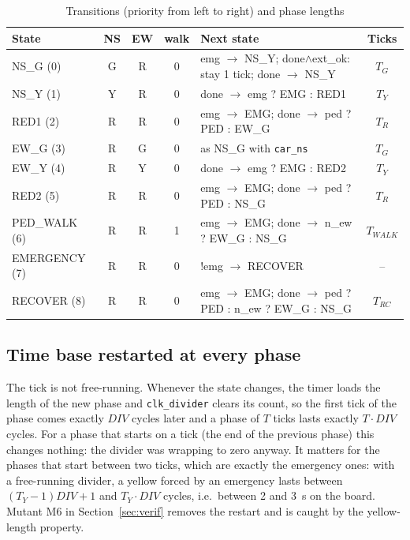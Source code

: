 \documentclass[conference]{IEEEtran}
\newcommand{\code}[1]{\texttt{\upshape #1}}
\newcommand{\st}[1]{\textsf{#1}}         %
\begin{document}
\begin{table}[t]
\centering
\caption{Transitions (priority from left to right) and phase lengths}
\label{tab:fsm}
\scriptsize
\setlength{\tabcolsep}{3pt}
\begin{tabular}{@{}l c c c l c@{}}
\toprule
State & NS & EW & walk & Next state & Ticks \\
\midrule
\st{NS\_G} (0) & G & R & 0 & emg $\to$ \st{NS\_Y}; done$\wedge$ext\_ok: stay 1 tick; done $\to$ \st{NS\_Y} & $T_G$ \\
\st{NS\_Y} (1) & Y & R & 0 & done $\to$ emg ? \st{EMG} : \st{RED1} & $T_Y$ \\
\st{RED1} (2) & R & R & 0 & emg $\to$ \st{EMG}; done $\to$ ped ? \st{PED} : \st{EW\_G} & $T_R$ \\
\st{EW\_G} (3) & R & G & 0 & as \st{NS\_G} with \code{car\_ns} & $T_G$ \\
\st{EW\_Y} (4) & R & Y & 0 & done $\to$ emg ? \st{EMG} : \st{RED2} & $T_Y$ \\
\st{RED2} (5) & R & R & 0 & emg $\to$ \st{EMG}; done $\to$ ped ? \st{PED} : \st{NS\_G} & $T_R$ \\
\st{PED\_WALK} (6) & R & R & 1 & emg $\to$ \st{EMG}; done $\to$ n\_ew ? \st{EW\_G} : \st{NS\_G} & $T_{WALK}$ \\
\st{EMERGENCY} (7) & R & R & 0 & !emg $\to$ \st{RECOVER} & -- \\
\st{RECOVER} (8) & R & R & 0 & emg $\to$ \st{EMG}; done $\to$ ped ? \st{PED} : n\_ew ? \st{EW\_G} : \st{NS\_G} & $T_{RC}$ \\
\bottomrule
\end{tabular}
\end{table}

\subsection{Time base restarted at every phase}
The tick is not free-running. Whenever the state changes, the timer loads the
length of the new phase and \code{clk\_divider} clears its count, so the first
tick of the phase comes exactly $\mathit{DIV}$ cycles later and a phase of $T$
ticks lasts exactly $T\cdot\mathit{DIV}$ cycles. For a phase that starts on a
tick (the end of the previous phase) this changes nothing: the divider was
wrapping to zero anyway. It matters for the phases that start between two ticks,
which are exactly the emergency ones: with a free-running divider, a yellow forced
by an emergency lasts between $(T_Y-1)\mathit{DIV}+1$ and $T_Y\cdot\mathit{DIV}$
cycles, i.e.\ between 2 and 3~s on the board. Mutant M6 in
Section~\ref{sec:verif} removes the restart and is caught by the yellow-length
property.
\end{document}
